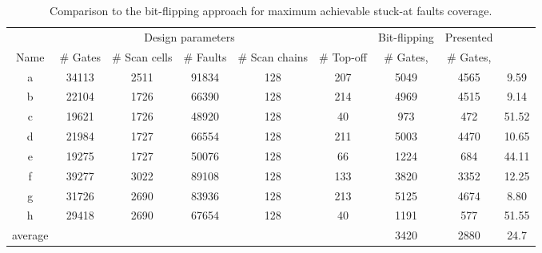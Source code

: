 \documentclass[10pt,conference]{IEEEtran}
\begin{document}
\begin{table*}[t!]\centering\footnotesize
\begin{tabular}{|c|c|c|c|c|c||c|c|c|} \hline               
\multicolumn{6}{|c|}{Design parameters} & Bit-flipping & Presented & \multirow{2}{*}{}  \\ \cline{1-6}
Name	& \# Gates & \# Scan cells & \# Faults & \# Scan chains & \# Top-off & \# Gates,  & \# Gates,  & \\ \hline
a	& 34113	&	2511	&	91834	&	128	&	207	&	5049	&	4565	&	9.59	\\
b	& 22104	&	1726	&	66390	&	128	&	214	&	4969	&	4515	&	9.14	\\
c	& 19621	&	1726	&	48920	&	128	&	40	&	973	&	472	&	51.52	\\
d	& 21984	&	1727	&	66554	&	128	&	211	&	5003	&	4470	&	10.65	\\
e	& 19275	&	1727	&	50076	&	128	&	66	&	1224	&	684	&	44.11	\\
f	& 39277	&	3022	&	89108	&	128	&	133	&	3820	&	3352	&	12.25	\\
g	& 31726	&	2690	&	83936	&	128	&	213	&	5125	&	4674	&	8.80	\\
h	& 29418	&	2690	&	67654	&	128	&	40	&	1191	&	577	&	51.55	\\ \hline
average & \multicolumn{5}{|c||}{}	& 3420	&	2880	&	24.7	\\ \hline
\end{tabular}
\caption{Comparison to the bit-flipping approach for maximum achievable stuck-at faults coverage.}
\label{ta2}
\end{table*}
\end{document}
